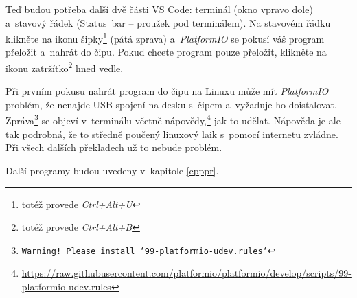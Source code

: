  Teď budou potřeba další dvě části VS Code: terminál  (okno vpravo dole) a~stavový řádek (Status~bar -- proužek pod terminálem). 
 Na stavovém řádku klikněte na ikonu šipky\footnote{totéž provede {\it Ctrl+Alt+U}} (pátá zprava) a~{\it PlatformIO} se pokusí váš program přeložit a~nahrát do čipu. 
 Pokud chcete program pouze přeložit, klikněte na ikonu zatržítko\footnote{totéž provede {\it Ctrl+Alt+B}} hned vedle. 
 
 Při prvním pokusu nahrát program do čipu na Linuxu může mít {\it PlatformIO} problém, že nenajde USB spojení na desku s~čipem a~vyžaduje ho doistalovat. 
 Zpráva\footnote{\tt Warning! Please install `99-platformio-udev.rules`} se objeví v~terminálu včetně nápovědy,\footnote{\url{https://raw.githubusercontent.com/platformio/platformio/develop/scripts/99-platformio-udev.rules}} jak to udělat.
 Nápověda je ale tak podrobná, že to středně poučený linuxový laik s~pomocí internetu zvládne.
 Při všech dalších překladech už to nebude problém.  
 
 Další programy budou uvedeny v~kapitole \ref{cpppr}. 
 